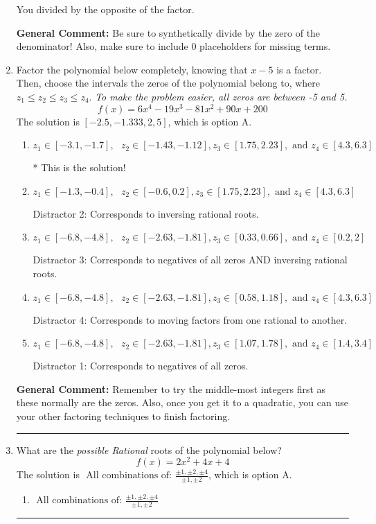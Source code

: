 \documentclass{extbook}[14pt]
\newcommand{\litem}[1]{\item #1

\rule{\textwidth}{0.4pt}}
\begin{document}
\begin{enumerate}
{\begin{enumerate}[label=\Alph*.]
 You divided by the opposite of the factor.
\end{enumerate}

\textbf{General Comment:} Be sure to synthetically divide by the zero of the denominator! Also, make sure to include 0 placeholders for missing terms.
}
\litem{
Factor the polynomial below completely, knowing that $x -5$ is a factor. Then, choose the intervals the zeros of the polynomial belong to, where $z_1 \leq z_2 \leq z_3 \leq z_4$. \textit{To make the problem easier, all zeros are between -5 and 5.}
\[ f(x) = 6x^{4} -19 x^{3} -81 x^{2} +90 x + 200 \]The solution is \( [-2.5, -1.333, 2, 5] \), which is option A.\begin{enumerate}[label=\Alph*.]
\item \( z_1 \in [-3.1, -1.7], \text{   }  z_2 \in [-1.43, -1.12], z_3 \in [1.75, 2.23], \text{   and   } z_4 \in [4.3, 6.3] \)

* This is the solution!
\item \( z_1 \in [-1.3, -0.4], \text{   }  z_2 \in [-0.6, 0.2], z_3 \in [1.75, 2.23], \text{   and   } z_4 \in [4.3, 6.3] \)

 Distractor 2: Corresponds to inversing rational roots.
\item \( z_1 \in [-6.8, -4.8], \text{   }  z_2 \in [-2.63, -1.81], z_3 \in [0.33, 0.66], \text{   and   } z_4 \in [0.2, 2] \)

 Distractor 3: Corresponds to negatives of all zeros AND inversing rational roots.
\item \( z_1 \in [-6.8, -4.8], \text{   }  z_2 \in [-2.63, -1.81], z_3 \in [0.58, 1.18], \text{   and   } z_4 \in [4.3, 6.3] \)

 Distractor 4: Corresponds to moving factors from one rational to another.
\item \( z_1 \in [-6.8, -4.8], \text{   }  z_2 \in [-2.63, -1.81], z_3 \in [1.07, 1.78], \text{   and   } z_4 \in [1.4, 3.4] \)

 Distractor 1: Corresponds to negatives of all zeros.
\end{enumerate}

\textbf{General Comment:} Remember to try the middle-most integers first as these normally are the zeros. Also, once you get it to a quadratic, you can use your other factoring techniques to finish factoring.
}
\litem{
What are the \textit{possible Rational} roots of the polynomial below?
\[ f(x) = 2x^{2} +4 x + 4 \]The solution is \( \text{ All combinations of: }\frac{\pm 1,\pm 2,\pm 4}{\pm 1,\pm 2} \), which is option A.\begin{enumerate}[label=\Alph*.]
\item \( \text{ All combinations of: }\frac{\pm 1,\pm 2,\pm 4}{\pm 1,\pm 2} \)


\end{enumerate}}
\end{enumerate}
\end{document}
